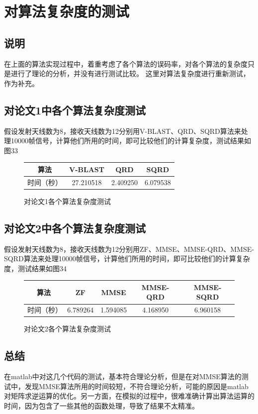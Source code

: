 \documentclass[a4paper,12pt]{article}
\begin{document}
	\section{对算法复杂度的测试}
	\subsection{说明}
	在上面的算法实现过程中，着重考虑了各个算法的误码率，对各个算法的复杂度只是进行了理论的分析，并没有进行测试比较。
	这里对算法复杂度进行重新测试，作为补充。
	\subsection{对论文1中各个算法复杂度测试}
	假设发射天线数为8，接收天线数为12分别用V-BLAST、QRD、SQRD算法来处理10000帧信号，计算他们所用的时间，即可比较他们的计算复杂度，测试结果如图33
	\begin{figure}[h]
		\centering
		\begin{tabular}{|c|c|c|c|}
			\hline
			算法 & V-BLAST & QRD & SQRD \\
			\hline
			时间（秒） & 27.210518 & 2.409250 & 6.079538 \\
			\hline 
		\end{tabular}
		\caption{对论文1各个算法复杂度测试}
	\end{figure}
	\subsection{对论文2中各个算法复杂度测试}
	假设发射天线数为8，接收天线数为12分别用ZF、MMSE、MMSE-QRD、MMSE-SQRD算法来处理10000帧信号，计算他们所用的时间，即可比较他们的计算复杂度，测试结果如图34
	\begin{figure}[h]
		\centering
		\begin{tabular}{|c|c|c|c|c|}
			\hline
			算法 & ZF & MMSE & MMSE-QRD & MMSE-SQRD \\
			\hline
			时间（秒） & 6.789264 & 1.594085 & 4.168950 & 6.960158 \\
			\hline 
		\end{tabular}
		\caption{对论文2各个算法复杂度测试}
	\end{figure}
	\subsection{总结}
	在matlab中对这几个代码的测试，基本符合理论分析，但是在对MMSE算法的测试中，发现MMSE算法所用的时间较短，不符合理论分析，可能的原因是matlab对矩阵求逆运算的优化。另一方面，在模拟的过程中，很难准确计算出算法运算的时间，因为包含了一些其他的函数处理，导致了结果不太精准。
\end{document}
